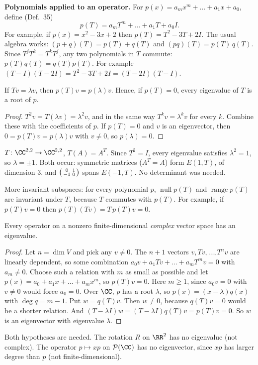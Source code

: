 \documentclass[10pt]{scrartcl}
\DeclareMathOperator{\nul}{null}
\DeclareMathOperator{\range}{range}
\newcommand{\PP}{\mathcal P}
\begin{document}
\textbf{Polynomials applied to an operator.} For $p(x)=a_mx^m+\dots+a_1x+a_0$, define (Def.~35)
\[ p(T)=a_mT^m+\dots+a_1T+a_0I. \]
For example, if $p(x)=x^2-3x+2$ then $p(T)=T^2-3T+2I$. The usual algebra works: $(p+q)(T)=p(T)+q(T)$ and $(pq)(T)=p(T)\,q(T)$. Since $T^jT^k=T^kT^j$, any two polynomials in $T$ commute: $p(T)q(T)=q(T)p(T)$. For example $(T-I)(T-2I)=T^2-3T+2I=(T-2I)(T-I)$.

\begin{proposition*}
  If $Tv=\lambda v$, then $p(T)v=p(\lambda)v$. Hence, if $p(T)=0$, every eigenvalue of $T$ is a root of $p$.
\end{proposition*}
\begin{proof}
  $T^2v=T(\lambda v)=\lambda^2v$, and in the same way $T^kv=\lambda^kv$ for every $k$. Combine these with the coefficients of $p$. If $p(T)=0$ and $v$ is an eigenvector, then $0=p(T)v=p(\lambda)v$ with $v\ne0$, so $p(\lambda)=0$.
\end{proof}

\begin{example*}[Ex.~52]
  $T\colon\CC^{2,2}\to\CC^{2,2}$, $T(A)=A^T$. Since $T^2=I$, every eigenvalue satisfies $\lambda^2=1$, so $\lambda=\pm1$. Both occur: symmetric matrices ($A^T=A$) form $E(1,T)$, of dimension $3$, and $\begin{psmallmatrix}0&1\\-1&0\end{psmallmatrix}$ spans $E(-1,T)$. No determinant was needed.
\end{example*}

More invariant subspaces: for every polynomial $p$, $\nul p(T)$ and $\range p(T)$ are invariant under $T$, because $T$ commutes with $p(T)$. For example, if $p(T)v=0$ then $p(T)(Tv)=T\,p(T)v=0$.

\begin{theorem*}
  Every operator on a nonzero finite-dimensional \emph{complex} vector space has an eigenvalue.
\end{theorem*}
\begin{proof}
  Let $n=\dim V$ and pick any $v\ne0$. The $n+1$ vectors $v,Tv,\dots,T^nv$ are linearly dependent, so some combination $a_0v+a_1Tv+\dots+a_mT^mv=0$ with $a_m\ne0$. Choose such a relation with $m$ as small as possible and let $p(x)=a_0+a_1x+\dots+a_mx^m$, so $p(T)v=0$. Here $m\ge1$, since $a_0v=0$ with $v\ne0$ would force $a_0=0$.
  Over $\CC$, $p$ has a root $\lambda$, so $p(x)=(x-\lambda)q(x)$ with $\deg q=m-1$. Put $w=q(T)v$. Then $w\ne0$, because $q(T)v=0$ would be a shorter relation. And $(T-\lambda I)w=(T-\lambda I)q(T)v=p(T)v=0$. So $w$ is an eigenvector with eigenvalue $\lambda$.
\end{proof}
Both hypotheses are needed. The rotation $R$ on $\RR^2$ has no eigenvalue (not complex). The operator $p\mapsto xp$ on $\PP(\CC)$ has no eigenvector, since $xp$ has larger degree than $p$ (not finite-dimensional).
\end{document}
